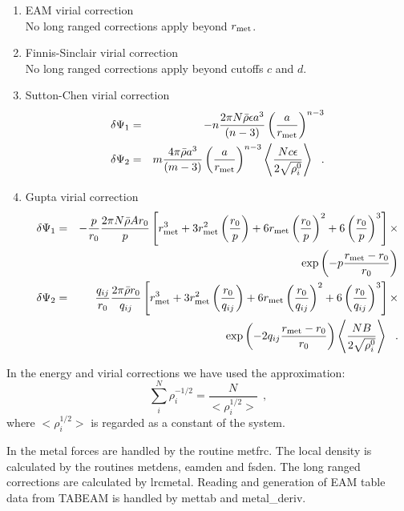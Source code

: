\begin{enumerate}
\item EAM virial correction \\
No long ranged corrections apply beyond $r_{\rm met}$.
\item Finnis-Sinclair virial correction \\
No long ranged corrections apply beyond cutoffs $c$ and $d$.
\item Sutton-Chen virial correction
\begin{eqnarray}
\delta \Psi_{1} &=& -n \frac{2 \pi N \bar{\rho} \epsilon a^{3}}{(n-3)}
\left( \frac{a}{r_{\rm met}} \right)^{n-3} \nonumber \\
\delta \Psi_{2} &=& m \frac{4 \pi \bar{\rho} a^{3}}{(m-3)} \left( \frac{a}{r_{\rm met}} \right)^{n-3}
\left< \frac{N c \epsilon}{2\sqrt{\rho_{i}^{0}}} \right>~~.
\end{eqnarray}
\item Gupta virial correction
\begin{eqnarray}
\delta \Psi_{1} &=& -\frac{p}{r_{0}} \frac{2 \pi N \bar{\rho} A r_{0}}{p}
\left[ r_{\rm met}^{3} + 3 r_{\rm met}^{2} \left(\frac{r_{0}}{p}\right) +
6 r_{\rm met} \left(\frac{r_{0}}{p}\right)^{2} + 6 \left(\frac{r_{0}}{p}\right)^{3} \right] \times \nonumber \\
& & \exp \left( -p \frac{r_{\rm met}-r_{0}}{r_{0}}\right) \nonumber \\
\delta \Psi_{2} &=& \frac{q_{ij}}{r_{0}} \frac{2 \pi \bar{\rho} r_{0}}{q_{ij}}
\left[ r_{\rm met}^{3} + 3 r_{\rm met}^{2} \left(\frac{r_{0}}{q_{ij}}\right) +
6 r_{\rm met} \left(\frac{r_{0}}{q_{ij}}\right)^{2} + 6 \left(\frac{r_{0}}{q_{ij}}\right)^{3} \right] \times \\
& & \exp \left( -2 q_{ij} \frac{r_{\rm met}-r_{0}}{r_{0}}\right)
\left< \frac{N B}{2\sqrt{\rho_{i}^{0}}} \right>~~. \nonumber
\end{eqnarray}
\end{enumerate}

In the energy and virial corrections we have used the approximation:
\begin{equation}
\sum_{i}^{N}\rho_{i}^{-1/2} = \frac{N}{<\rho_{i}^{1/2}>}~~,
\end{equation}
where $<\rho_{i}^{1/2}>$ is regarded as a constant of the system.

In \D{} the metal forces are handled by the routine {\sc metfrc}.  The
local density is calculated by the routines {\sc metdens}, {\sc
eamden} and {\sc fsden}.  The long ranged corrections are calculated
by {\sc lrcmetal}.  Reading and generation of EAM table data from
TABEAM is handled by {\sc mettab} and {\sc metal\_deriv}.

